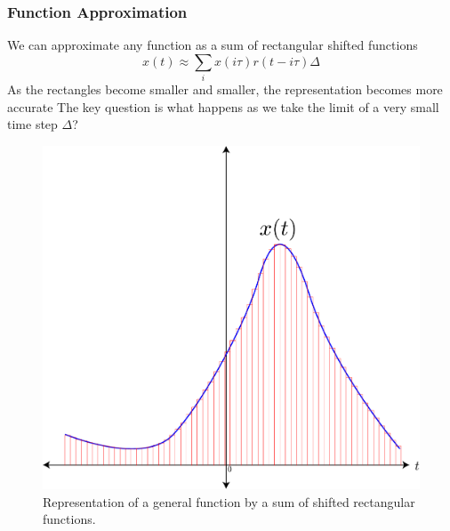 \subsubsection{Function Approximation}
We can approximate any function as a sum of rectangular shifted functions
    \begin{equation}
        x(t) \approx \sum_i x(i\tau) r(t - i\tau) \Delta
    \end{equation}
 As the rectangles become smaller and smaller, the representation becomes more accurate
 The key question is what happens as we take the limit of a very small time step $\Delta$?
\begin{figure}[tb]
\begin{center}
\includegraphics[width=.55\columnwidth]{func_rect}
\end{center}
\caption{Representation of a general function by a sum of shifted rectangular functions. }
\label{fig:func_rect}
\end{figure}
